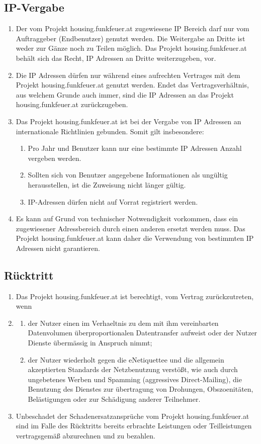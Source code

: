 \documentclass[parskip=half]{article}
\begin{document}
\subsection{IP-Vergabe}
\begin{enumerate}
\item Der vom Projekt housing.funkfeuer.at zugewiesene IP Bereich darf nur vom Auftraggeber
(Endbenutzer) genutzt werden. Die Weitergabe an Dritte ist weder zur Gänze noch zu
Teilen möglich. Das Projekt housing.funkfeuer.at behält sich das Recht, IP Adressen an
Dritte weiterzugeben, vor.
\item Die IP Adressen dürfen nur während eines aufrechten Vertrages mit dem Projekt
housing.funkfeuer.at genutzt werden. Endet das Vertragsverhältnis, aus welchem Grunde
auch immer, sind die IP Adressen an das Projekt housing.funkfeuer.at zurückzugeben.
\item Das Projekt housing.funkfeuer.at ist bei der Vergabe von IP Adressen an internationale
Richtlinien gebunden. Somit gilt insbesondere:
\begin{enumerate}
\item Pro Jahr und Benutzer kann nur eine bestimmte IP Adressen Anzahl vergeben werden.
\item Sollten sich von Benutzer angegebene Informationen als ungültig herausstellen, ist die
Zuweisung nicht länger gültig.
\item IP-Adressen dürfen nicht auf Vorrat registriert werden.
\end{enumerate}
\item Es kann auf Grund von technischer Notwendigkeit vorkommen, dass ein zugewiesener
Adressbereich durch einen anderen ersetzt werden muss. Das Projekt housing.funkfeuer.at
kann daher die Verwendung von bestimmten IP Adressen nicht garantieren.
\end{enumerate}

\subsection{ Rücktritt}
\begin{enumerate}
\item[] Das Projekt housing.funkfeuer.at ist berechtigt, vom Vertrag zurückzutreten, wenn
\item\begin{enumerate}
\item der Nutzer einen im Verhaeltnis zu dem mit ihm vereinbarten Datenvolumen
überproportionalen Datentransfer aufweist oder der Nutzer Dienste übermässig in
Anspruch nimmt;
\item der Nutzer wiederholt gegen die eNetiquettee und die allgemein akzeptierten Standards
der Netzbenutzung verstößt, wie auch durch ungebetenes Werben und Spamming
(aggressives Direct-Mailing), die Benutzung des Dienstes zur übertragung von
Drohungen, Obszoenitäten, Belästigungen oder zur Schädigung anderer Teilnehmer.
\end{enumerate}
\item Unbeschadet der Schadenersatzansprüche vom Projekt housing.funkfeuer.at sind im
Falle des Rücktritts bereits erbrachte Leistungen oder Teilleistungen vertragsgemäß
abzurechnen und zu bezahlen.
\end{enumerate}
\end{document}
